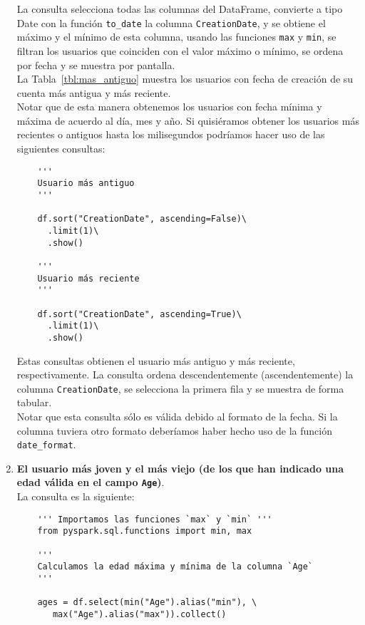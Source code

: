\documentclass[12pt,a4paper,twoside,openright,titlepage,final]{article}
\begin{document}
\begin{enumerate}
	La consulta selecciona todas las columnas del DataFrame, convierte a tipo Date con la función \texttt{to\_date} la columna \texttt{CreationDate}, y se obtiene el máximo y el mínimo de esta columna, usando las funciones \texttt{max} y \texttt{min}, se filtran los usuarios que coinciden con el valor máximo o mínimo, se ordena por fecha y se muestra por pantalla.\\
	
	La Tabla~\ref{tbl:mas_antiguo} muestra los usuarios con fecha de creación de su cuenta más antigua y más reciente.\\
	
	Notar que de esta manera obtenemos los usuarios con fecha  mínima y máxima de acuerdo al día, mes y año. Si quisiéramos obtener los usuarios más recientes o antiguos hasta los milisegundos podríamos hacer uso de las siguientes consultas: 
	
	\begin{verbatim}
	''' 
	Usuario más antiguo 
	'''
	
	df.sort("CreationDate", ascending=False)\
	  .limit(1)\
	  .show()
	
	''' 
	Usuario más reciente 
	'''
	
	df.sort("CreationDate", ascending=True)\
	  .limit(1)\
	  .show()
	\end{verbatim}
	
	Estas consultas obtienen el usuario más antiguo y más reciente, respectivamente. La consulta ordena descendentemente (ascendentemente) la columna \texttt{CreationDate}, se selecciona la primera fila y se muestra de forma tabular.\\
	
	Notar que esta consulta sólo es válida debido al formato de la fecha. Si la columna tuviera otro formato deberíamos haber hecho uso de la función \texttt{date\_format}.  
	
	\item \textbf{El usuario más joven y el más viejo (de los que han indicado una edad válida en el campo \texttt{Age})}.\\
	
	La consulta es la siguiente:
	
	\begin{verbatim}
	''' Importamos las funciones `max` y `min` '''
	from pyspark.sql.functions import min, max
	
	''' 
	Calculamos la edad máxima y mínima de la columna `Age` 
	'''
	
	ages = df.select(min("Age").alias("min"), \
       max("Age").alias("max")).collect()
	\end{verbatim}
	

\end{enumerate}
\end{document}
